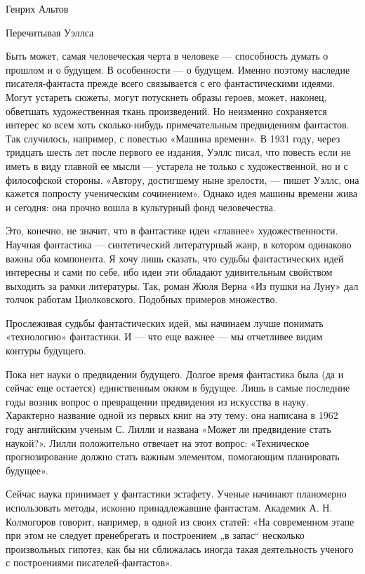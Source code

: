 
Генрих Альтов

Перечитывая Уэллса


Быть может, самая  человеческая черта  в человеке —  способность думать  о
прошлом и о будущем.  В особенности — о  будущем. Именно поэтому  наследие
писателя-фантаста прежде всего связывается  с его фантастическими  идеями.
Могут устареть  сюжеты, могут  потускнеть образы  героев, может,  наконец,
обветшать художественная  ткань  произведений.  Но  неизменно  сохраняется
интерес ко всем хоть сколько-нибудь примечательным предвидениям фантастов.
Так случилось, например, с повестью  «Машина времени». В 1931 году,  через
тридцать шесть лет после первого ее издания, Уэллс писал, что повесть если
не иметь в виду главной ее мысли — устарела не только с художественной, но
и с философской стороны. «Автору, достигшему ныне зрелости, — пишет Уэллс,
она кажется попросту ученическим  сочинением». Однако идея машины  времени
жива и сегодня: она прочно вошла в культурный фонд человечества.

Это, конечно, не значит, что в фантастике идеи «главнее» художественности.
Научная фантастика — синтетический литературный жанр, в котором  одинаково
важны оба компонента. Я хочу лишь сказать, что судьбы фантастических  идей
интересны и сами  по себе,  ибо идеи эти  обладают удивительным  свойством
выходить за рамки литературы. Так, роман Жюля Верна «Из пушки на Луну» дал
толчок работам Циолковского. Подобных примеров множество.

Прослеживая  судьбы  фантастических  идей,  мы  начинаем  лучше   понимать
«технологию» фантастики.  И --- что еще  важнее --- мы  отчетливее видим  контуры
будущего.

Пока нет науки о предвидении будущего. Долгое время фантастика была (да  и
сейчас еще остается) единственным окном в будущее. Лишь в самые  последние
годы возник  вопрос  о  превращении предвидения  из  искусства  в  науку.
Характерно название одной из первых книг на эту тему: она написана в  1962
году английским  ученым С.  Лилли и  названа «Может  ли предвидение  стать
наукой?».  Лилли   положительно отвечает  на   этот  вопрос:   «Техническое
прогнозирование должно  стать  важным элементом,  помогающим  планировать
будущее».

Сейчас наука принимает у  фантастики эстафету. Ученые начинают  планомерно
использовать методы,  исконно  принадлежавшие фантастам.  Академик  А.  Н.
Колмогоров говорит, например,  в одной  из своих  статей: «На  современном
этапе при этом не следует  пренебрегать и построением „в запас“  несколько
произвольных гипотез,  как  бы  ни сближалась  иногда  такая  деятельность
ученого с построениями писателей-фантастов».

